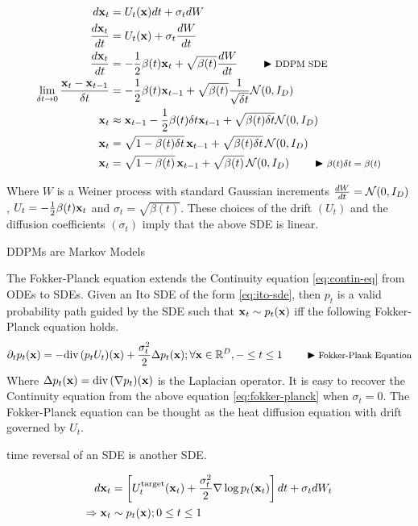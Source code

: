 \documentclass[a4paper, 11pt]{article}
\begin{document}
\begin{align}
    d\mbox{$\mbox{$\mathbf{x}$}$}_t &= U_t(\mbox{$\mbox{$\mathbf{x}$}$}) dt + \sigma_t dW \label{eq:ito-sde}\\ 
    \frac{d\mbox{$\mbox{$\mathbf{x}$}$}_t}{dt} &= U_t(\mbox{$\mbox{$\mathbf{x}$}$}) + \sigma_t \frac{dW}{dt} \\ 
    \frac{d \mbox{$\mbox{$\mathbf{x}$}$}_t}{dt} &= -\frac{1}{2} \beta(t) \mbox{$\mbox{$\mathbf{x}$}$}_t + \sqrt{\beta(t)} \frac{dW}{dt} \qquad \blacktriangleright\text{\footnotesize DDPM SDE} \\
    \lim_{\delta t \to 0} \frac{\mbox{$\mbox{$\mathbf{x}$}$}_t - \mbox{$\mbox{$\mathbf{x}$}$}_{t-1}}{\delta t} &= -\frac{1}{2} \beta(t)\mbox{$\mbox{$\mathbf{x}$}$}_{t-1} +  \sqrt{\beta(t)} \frac{1}{\sqrt{\delta t}} \mbox{$\cal N$}(0, I_D) \\
    \mbox{$\mbox{$\mathbf{x}$}$}_t &\approx \mbox{$\mbox{$\mathbf{x}$}$}_{t-1} -\frac{1}{2} \beta(t)\delta t \mbox{$\mbox{$\mathbf{x}$}$}_{t-1} + \sqrt{\beta(t)\delta t} \mbox{$\cal N$}(0, I_D) \\
    \mbox{$\mbox{$\mathbf{x}$}$}_t &= \sqrt{1 - \beta(t)\delta t}\, \mbox{$\mbox{$\mathbf{x}$}$}_{t-1} + \sqrt{\beta(t)\delta t}\, \mbox{$\cal N$}(0, I_D) \\
    \mbox{$\mbox{$\mathbf{x}$}$}_t &= \sqrt{1 - \beta(t)}\, \mbox{$\mbox{$\mathbf{x}$}$}_{t-1} + \sqrt{\beta(t)} \, \mbox{$\cal N$}(0, I_D) \qquad \blacktriangleright\text{\footnotesize $\beta(t) \delta t = \beta(t)$} \label{eq:ddpm_sde}
\end{align}

Where $W$ is a Weiner process with standard Gaussian increments $\frac{dW}{dt} = \mbox{$\cal N$}(0, I_D)$, $U_t = -\frac{1}{2} \beta(t) \mbox{$\mbox{$\mathbf{x}$}$}_t$ and $\sigma_t = \sqrt{\beta(t)}$. These choices of the drift $(U_t)$ and the diffusion coefficients $(\sigma_t)$ imply that the above SDE is linear. 

DDPMs are Markov Models


The Fokker-Planck equation extends the Continuity equation \eqref{eq:contin-eq} from ODEs to SDEs. Given an Ito SDE of the form \eqref{eq:ito-sde}, then $p_t$ is a valid probability path guided by the SDE such that $\mbox{$\mbox{$\mathbf{x}$}$}_t \sim p_t(\mbox{$\mbox{$\mathbf{x}$}$})$ iff the following Fokker-Planck equation holds.
\begin{align}
    \partial_t p_t(\mbox{$\mbox{$\mathbf{x}$}$}) = -\text{div}\, (p_t U_t)(\mbox{$\mbox{$\mathbf{x}$}$}) + \frac{\sigma_t^2}{2} \Delta p_t(\mbox{$\mbox{$\mathbf{x}$}$}); \forall \mbox{$\mbox{$\mathbf{x}$}$} \in \mathbb{R}^D, - \leq t \leq 1 \qquad \blacktriangleright\text{\footnotesize Fokker-Plank Equation} \label{eq:fokker-planck}
\end{align}
Where $\Delta p_t(\mbox{$\mbox{$\mathbf{x}$}$}) = \text{div}\, (\nabla p_t)(\mbox{$\mbox{$\mathbf{x}$}$})$ is the Laplacian operator. It is easy to recover the Continuity equation from the above equation \eqref{eq:fokker-planck} when $\sigma_t = 0$. The Fokker-Planck equation can be thought as the heat diffusion equation with drift governed by $U_t$.

time reversal of an SDE is another SDE. 

\begin{align}
    d\mbox{$\mbox{$\mathbf{x}$}$}_t &= \left [U_t^{\text{target}}(\mbox{$\mbox{$\mathbf{x}$}$}_t) + \frac{\sigma_t^2}{2} \nabla \log p_t(\mbox{$\mbox{$\mathbf{x}$}$}_t) \right ] dt + \sigma_t d W_t \\
    \Rightarrow \mbox{$\mbox{$\mathbf{x}$}$}_t &\sim p_t(\mbox{$\mbox{$\mathbf{x}$}$}); 0 \leq t \leq 1
\end{align}
\end{document}
